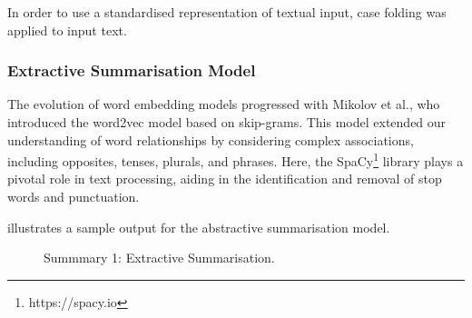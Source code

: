 \documentclass[conference]{IEEEtran}
\begin{document}
In order to use a standardised representation of textual input, case folding was applied to input text.

\subsubsection{Extractive Summarisation Model}
\label{sec:results_and_discussion:automatic_summarisation:extractive}

The evolution of word embedding models progressed with Mikolov et al., who introduced the word2vec model based on skip-grams. This model extended our understanding of word relationships by considering complex
associations, including opposites, tenses, plurals, and phrases. Here, the SpaCy\footnote{https://spacy.io} library plays a
pivotal role in text processing, aiding in the identification and removal of stop words and
punctuation.

 illustrates a sample output for the abstractive summarisation model.

\begin{figure}%
%
\caption{Summmary 1: Extractive Summarisation.}
\label{fig:results_and_discussion:summarisation_models:summary1}
\end{figure}
\end{document}

